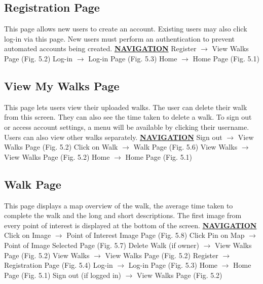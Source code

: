 \documentclass[12pt]{article}
\begin{document}
\subsection{Registration Page}
\par{This page allows new users to create an account. Existing users may also click log-in via this
page. New users must perform an authentication to prevent automated accounts being
created.} \newline
\textbf{\underline{NAVIGATION}} \newline
Register $\rightarrow$ View Walks Page (Fig. 5.2) \newline
Log-in $\rightarrow$ Log-in Page (Fig. 5.3) \newline
Home $\rightarrow$ Home Page (Fig. 5.1) \newline
\subsection{View My Walks Page}
\par{This page lets users view their uploaded walks. The user can delete their walk from this
screen. They can also see the time taken to delete a walk. To sign out or access account
settings, a menu will be available by clicking their username. Users can also view other walks
separately.} \newline 
\textbf{\underline{NAVIGATION}} \newline
Sign out $\rightarrow$ View Walks Page (Fig. 5.2) \newline
Click on Walk $\rightarrow$ Walk Page (Fig. 5.6) \newline
View Walks $\rightarrow$ View Walks Page (Fig. 5.2) \newline
Home $\rightarrow$ Home Page (Fig. 5.1) \newline
\subsection{Walk Page}
\par{This page displays a map overview of the walk, the average time taken to complete the walk
and the long and short descriptions. The first image from every point of interest is displayed
at the bottom of the screen.} \newline
\textbf{\underline{NAVIGATION}} \newline
Click on Image $\rightarrow$ Point of Interest Image Page (Fig. 5.8) \newline
Click Pin on Map $\rightarrow$ Point of Image Selected Page (Fig. 5.7) \newline
Delete Walk (if owner) $\rightarrow$ View Walks Page (Fig. 5.2) \newline
View Walks $\rightarrow$ View Walks Page (Fig. 5.2) \newline
Register $\rightarrow$ Registration Page (Fig. 5.4) \newline
Log-in $\rightarrow$ Log-in Page (Fig. 5.3) \newline
Home $\rightarrow$ Home Page (Fig. 5.1) \newline
Sign out (if logged in) $\rightarrow$ View Walks Page (Fig. 5.2) \newline
\end{document}
